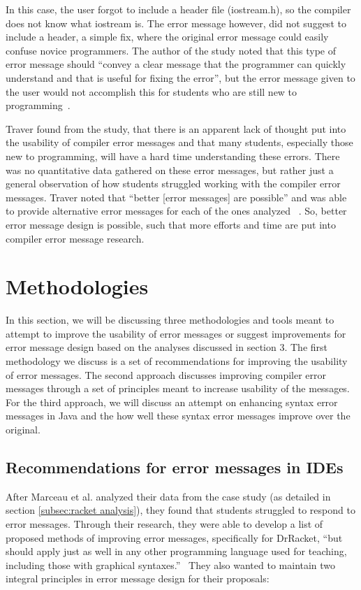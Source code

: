\documentclass{sig-alternate}
\begin{document}

In this case, the user forgot to include a header file (iostream.h), so the compiler does not know what iostream is.
The error message however, did not suggest to include a header, a simple fix, where the original error message could easily confuse novice programmers.
The author of the study noted that this type of error message should ``convey a clear message that the programmer can quickly understand and that is useful for fixing the error'', but the error message given to the user would not accomplish this for students who are still new to programming~\cite{Traver:2010}.

Traver found from the study, that there is an apparent lack of thought put into the usability of compiler error messages and that many students, especially those new to programming, will have a hard time understanding these errors.
There was no quantitative data gathered on these error messages, but rather just a general observation of how students struggled working with the compiler error messages.
Traver noted that ``better [error messages] are possible'' and was able to provide alternative error messages for each of the ones analyzed ~\cite{Traver:2010}.
So, better error message design is possible, such that more efforts and time are put into compiler error message research. 

\section{Methodologies}\label{sec:methodologies}
In this section, we will be discussing three methodologies and tools meant to attempt to improve the usability of error messages or suggest improvements for error message design based on the analyses discussed in section 3.
The first methodology we discuss is a set of recommendations for improving the usability of error messages.
The second approach discusses improving compiler error messages through a set of principles meant to increase usability of the messages.
For the third approach, we will discuss an attempt on enhancing syntax error messages in Java and the how well these syntax error messages improve over the original. 

\subsection{Recommendations for error messages in IDEs}\label{subsec:error message rubric}
After Marceau et al. analyzed their data from the case study (as detailed in section \ref{subsec:racket analysis}), they found that students struggled to respond to error messages.
Through their research, they were able to develop a list of proposed methods of improving error messages, specifically for DrRacket, ``but  should apply just as well in any other programming language used for teaching, including those with
graphical syntaxes.''~\cite{Marceau:2011:MYL:2048237.2048241}
They also wanted to maintain two integral principles in error message design for their proposals:
\end{document}
